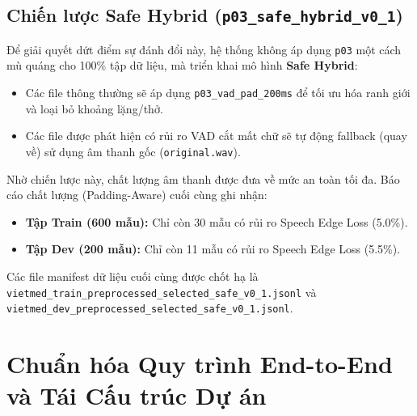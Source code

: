 \documentclass[12pt,a4paper]{article}
\begin{document}
\subsection{Chiến lược Safe Hybrid (\texttt{p03\_safe\_hybrid\_v0\_1})}
Để giải quyết dứt điểm sự đánh đổi này, hệ thống không áp dụng \texttt{p03} một cách mù quáng cho 100\% tập dữ liệu, mà triển khai mô hình \textbf{Safe Hybrid}:
\begin{itemize}[leftmargin=1.2cm]
    \item Các file thông thường sẽ áp dụng \texttt{p03\_vad\_pad\_200ms} để tối ưu hóa ranh giới và loại bỏ khoảng lặng/thở.
    \item Các file được phát hiện có rủi ro VAD cắt mất chữ sẽ tự động fallback (quay về) sử dụng âm thanh gốc (\texttt{original.wav}).
\end{itemize}
Nhờ chiến lược này, chất lượng âm thanh được đưa về mức an toàn tối đa. Báo cáo chất lượng (Padding-Aware) cuối cùng ghi nhận:
\begin{itemize}[leftmargin=1.2cm]
    \item \textbf{Tập Train (600 mẫu):} Chỉ còn 30 mẫu có rủi ro Speech Edge Loss (5.0\%).
    \item \textbf{Tập Dev (200 mẫu):} Chỉ còn 11 mẫu có rủi ro Speech Edge Loss (5.5\%).
\end{itemize}
Các file manifest dữ liệu cuối cùng được chốt hạ là \texttt{vietmed\_train\_preprocessed\_selected\_safe\_v0\_1.jsonl} và \texttt{vietmed\_dev\_preprocessed\_selected\_safe\_v0\_1.jsonl}.

\section{Chuẩn hóa Quy trình End-to-End và Tái Cấu trúc Dự án}
\end{document}
